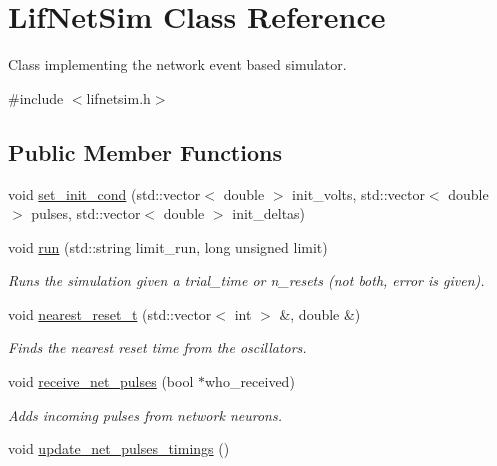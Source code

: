 \hypertarget{classLifNetSim}{\section{Lif\-Net\-Sim Class Reference}
\label{classLifNetSim}
}


Class implementing the network event based simulator.  




{\ttfamily \#include $<$lifnetsim.\-h$>$}

\subsection*{Public Member Functions}
\begin{DoxyCompactItemize}
\item 
void \hyperlink{classLifNetSim_a41b742a3933ce40ff395b8b91a4eac42}{set\-\_\-init\-\_\-cond} (std\-::vector$<$ double $>$ init\-\_\-volts, std\-::vector$<$ double $>$ pulses, std\-::vector$<$ double $>$ init\-\_\-deltas)
\item 
void \hyperlink{classLifNetSim_ab865fbba5713c71f09401543fb957d0f}{run} (std\-::string limit\-\_\-run, long unsigned limit)
\begin{DoxyCompactList}\small\item\em Runs the simulation given a trial\-\_\-time or n\-\_\-resets (not both, error is given). \end{DoxyCompactList}\item 
\hypertarget{classLifNetSim_ac117f1711884c51a9c0ab388c9af5081}{void \hyperlink{classLifNetSim_ac117f1711884c51a9c0ab388c9af5081}{nearest\-\_\-reset\-\_\-t} (std\-::vector$<$ int $>$ \&, double \&)}\label{classLifNetSim_ac117f1711884c51a9c0ab388c9af5081}

\begin{DoxyCompactList}\small\item\em Finds the nearest reset time from the oscillators. \end{DoxyCompactList}\item 
\hypertarget{classLifNetSim_a3add5023d4a28ebed0c9d72001963031}{void \hyperlink{classLifNetSim_a3add5023d4a28ebed0c9d72001963031}{receive\-\_\-net\-\_\-pulses} (bool $\ast$who\-\_\-received)}\label{classLifNetSim_a3add5023d4a28ebed0c9d72001963031}

\begin{DoxyCompactList}\small\item\em Adds incoming pulses from network neurons. \end{DoxyCompactList}\item 
\hypertarget{classLifNetSim_aab4f20795feda272fe6cbe07643006df}{void \hyperlink{classLifNetSim_aab4f20795feda272fe6cbe07643006df}{update\-\_\-net\-\_\-pulses\-\_\-timings} ()}\label{classLifNetSim_aab4f20795feda272fe6cbe07643006df}


\end{DoxyCompactItemize}
